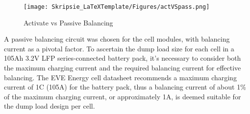 \begin{figure}[h!]
\centering
\texttt{[image: Skripsie\_LaTeXTemplate/Figures/actVSpass.png]}
\caption{Activate vs Passive Balancing \cite{generic}}
\label{fig:actVSpass}
\end{figure}
\noindent
A passive balancing circuit was chosen for the cell modules, with balancing current as a pivotal factor. To ascertain the dump load size for each cell in a 105Ah 3.2V LFP series-connected battery pack, it's necessary to consider both the maximum charging current and the required balancing current for effective balancing. The EVE Energy cell datasheet \cite{eve} recommends a maximum charging current of 1C (105A) for the battery pack, thus a balancing current of about 1\% of the maximum charging current, or approximately 1A, is deemed suitable for the dump load design per cell.

